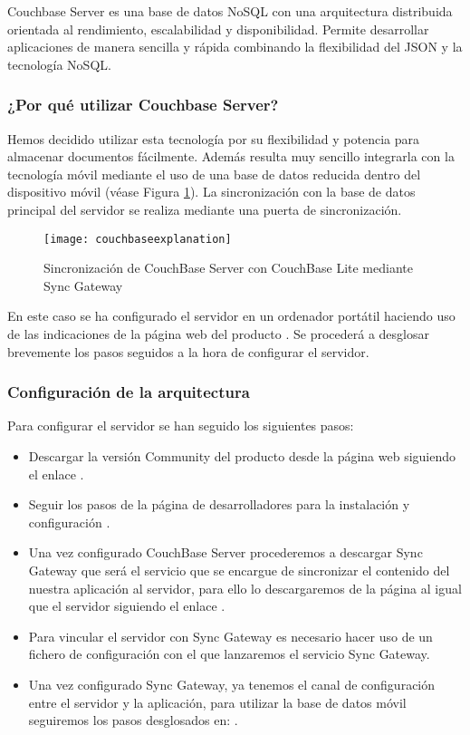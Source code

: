 Couchbase Server \cite{URL::couchBase} es una base de datos NoSQL \cite{URL::nosql} con una arquitectura distribuida orientada al rendimiento, escalabilidad y disponibilidad. Permite desarrollar aplicaciones de manera sencilla y rápida combinando la flexibilidad del JSON \cite{URL::json} y la tecnología NoSQL.

\subsubsection{¿Por qué utilizar Couchbase Server?}

Hemos decidido utilizar esta tecnología por su flexibilidad y potencia para almacenar documentos fácilmente. Además resulta muy sencillo integrarla con la tecnología móvil mediante el uso de una base de datos reducida dentro del dispositivo móvil (véase Figura \ref{fig:couchbaseexplanation}). La sincronización con la base de datos principal del servidor se realiza mediante una puerta de sincronización.

\begin{figure}[H]
	\centering
	\texttt{[image: couchbaseexplanation]}
	\caption{Sincronización de CouchBase Server con CouchBase Lite mediante Sync Gateway}
	\label{fig:couchbaseexplanation}
\end{figure}

En este caso se ha configurado el servidor en un ordenador portátil haciendo uso de las indicaciones de la página web del producto \cite{URL::couchweb}. Se procederá a desglosar brevemente los pasos seguidos a la hora de configurar el servidor.


\subsubsection{Configuración de la arquitectura}

Para configurar el servidor se han seguido los siguientes pasos: 


\begin{itemize}
\item Descargar la versión Community del producto desde la página web siguiendo el enlace \cite{URL::couchbaseDownload}. 
\item Seguir los pasos de la página de desarrolladores para la instalación y configuración \cite{URL::couchBaseGuide}. 
\item Una vez configurado CouchBase Server procederemos a descargar Sync Gateway que será el servicio que se encargue de sincronizar el contenido del nuestra aplicación al servidor, para ello lo descargaremos de la página al igual que el servidor siguiendo el enlace \cite{URL::couchbaseDownload} .
\item Para vincular el servidor con Sync Gateway es necesario hacer uso de un fichero de configuración con el que lanzaremos el servicio Sync Gateway.
\item Una vez configurado Sync Gateway, ya tenemos el canal de configuración entre el servidor y la aplicación, para utilizar la base de datos móvil seguiremos los pasos desglosados en: \cite{URL::couchBaseLite} .
\end{itemize}


